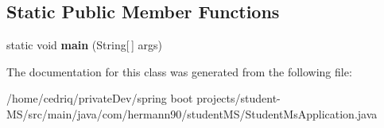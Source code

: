\subsection*{Static Public Member Functions}
\begin{DoxyCompactItemize}
\item 
static void {\bfseries main} (String\mbox{[}$\,$\mbox{]} args)\hypertarget{classcom_1_1hermann90_1_1student_m_s_1_1_student_ms_application_a32ee79c3cee393167598a92a26f507de}{}\label{classcom_1_1hermann90_1_1student_m_s_1_1_student_ms_application_a32ee79c3cee393167598a92a26f507de}

\end{DoxyCompactItemize}


The documentation for this class was generated from the following file\+:\begin{DoxyCompactItemize}
\item 
/home/cedriq/private\+Dev/spring boot projects/student-\/\+M\+S/src/main/java/com/hermann90/student\+M\+S/Student\+Ms\+Application.\+java\end{DoxyCompactItemize}
